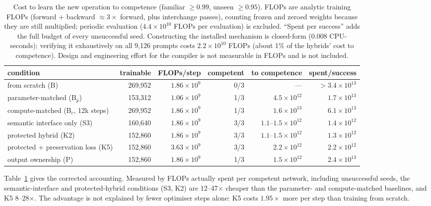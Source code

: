 \documentclass[11pt]{article}
\begin{document}
\begin{table}[t]\centering\small
\caption{Cost to learn the new operation to competence (familiar $\ge0.99$, unseen $\ge0.95$). FLOPs are analytic
training FLOPs (forward $+$ backward $\approx3\times$ forward, plus interchange passes), counting frozen and zeroed
weights because they are still multiplied; periodic evaluation ($4.4\times10^{10}$ FLOPs per evaluation) is excluded.
``Spent per success'' adds the full budget of every unsuccessful seed. Constructing the installed mechanism is
closed-form (0.008 CPU-seconds); verifying it exhaustively on all 9,126 prompts costs $2.2\times10^{10}$ FLOPs (about
1\% of the hybrids' cost to competence). Design and engineering effort for the compiler is not measurable in FLOPs and
is not included.}\label{tab:cost}
\setlength{\tabcolsep}{3pt}\footnotesize
\begin{tabular}{@{}lrrrrr@{}}\toprule
condition & trainable & FLOPs/step & competent & to competence & spent/success\\\midrule
from scratch (B) & 269,952 & $1.86\times10^9$ & 0/3 & --- & $>3.4\times10^{13}$\\
parameter-matched (B$_p$) & 153,312 & $1.06\times10^9$ & 1/3 & $4.5\times10^{12}$ & $1.7\times10^{13}$\\
compute-matched (B$_c$, 12k steps) & 269,952 & $1.86\times10^9$ & 1/3 & $1.6\times10^{13}$ & $6.1\times10^{13}$\\
semantic interface only (S3) & 160,640 & $1.86\times10^9$ & 3/3 & $1.1$--$1.5\times10^{12}$ & $1.4\times10^{12}$\\
protected hybrid (K2) & 152,860 & $1.86\times10^9$ & 3/3 & $1.1$--$1.5\times10^{12}$ & $1.3\times10^{12}$\\
protected $+$ preservation loss (K5) & 152,860 & $3.63\times10^9$ & 3/3 & $2.2\times10^{12}$ & $2.2\times10^{12}$\\
output ownership (P) & 152,860 & $1.86\times10^9$ & 1/3 & $1.5\times10^{12}$ & $2.4\times10^{13}$\\\bottomrule
\end{tabular}
\end{table}

Table~\ref{tab:cost} gives the corrected accounting. Measured by FLOPs actually spent per competent network, including
unsuccessful seeds, the semantic-interface and protected-hybrid conditions (S3, K2) are 12--47$\times$ cheaper than the
parameter- and compute-matched baselines, and K5 8--28$\times$. The advantage is not explained by fewer optimiser steps alone: K5 costs
$1.95\times$ more per step than training from scratch.
\end{document}
